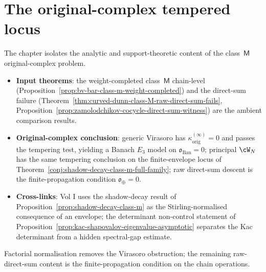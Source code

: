 \section{The original-complex tempered locus}
\label{sec:original-complex-location}

The chapter isolates the analytic and support-theoretic content of
the class~$\mathsf{M}$ original-complex problem.

\begin{itemize}[nosep]
\item \textbf{Input theorems}: the weight-completed
 class~$\mathsf{M}$ chain-level
 (Proposition~\ref{prop:bv-bar-class-m-weight-completed}) and
 the direct-sum failure
 (Theorem~\ref{thm:curved-dunn-class-M-raw-direct-sum-fails},
 Proposition~\ref{prop:zamolodchikov-cocycle-direct-sum-witness})
 are the ambient comparison results.
\item \textbf{Original-complex conclusion}: generic Virasoro has
 $\kappa^{(\infty)}_{\mathrm{orig}}=0$ and passes the tempering
 test, yielding a Banach $E_3$ model on
 $\mathfrak{o}_{\mathrm{Ban}}=0$; principal $\cW_N$ has the same
 tempering conclusion on the finite-envelope locus of
 Theorem~\ref{conj:shadow-decay-class-m-full-family}; raw
 direct-sum descent is the finite-propagation condition
 $\mathfrak{o}_{\oplus}=0$.
\item \textbf{Cross-links}: Vol I uses the shadow-decay result of
 Proposition~\ref{prop:shadow-decay-class-m} as the
 Stirling-normalised consequence of an envelope; the
 determinant non-control statement of
 Proposition~\ref{prop:kac-shapovalov-eigenvalue-asymptotic}
 separates the Kac determinant from a hidden spectral-gap
 estimate.
\end{itemize}

Factorial normalisation removes the Virasoro obstruction; the
remaining raw-direct-sum content is the finite-propagation condition
on the chain operations.
